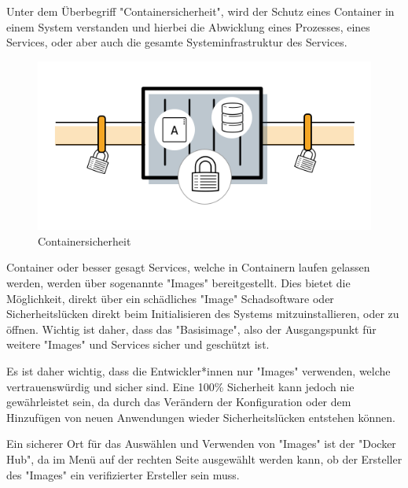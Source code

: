 
Unter dem Überbegriff "Containersicherheit", wird der Schutz eines Container in einem System verstanden und hierbei die Abwicklung eines Prozesses, eines Services, oder aber auch die gesamte Systeminfrastruktur des Services. \cite{ContainerSecurity}

\begin{figure}[H]
    \centering
    \includegraphics[width=\textwidth]{media/DockerAndContainering/Containersicherheit.png}
    \caption{Containersicherheit \cite{ContainerSecurity}}
\end{figure}


Container oder besser gesagt Services, welche in Containern laufen gelassen werden, werden über sogenannte "Images" bereitgestellt. Dies bietet die Möglichkeit, direkt über ein schädliches "Image" Schadsoftware oder Sicherheitslücken direkt beim Initialisieren des Systems mitzuinstallieren, oder zu öffnen. Wichtig ist daher, dass das "Basisimage", also der Ausgangspunkt für weitere "Images" und Services sicher und geschützt ist. \cite{ContainerSecurity}

Es ist daher wichtig, dass die Entwickler*innen nur "Images" verwenden, welche vertrauenswürdig und sicher sind. Eine 100\% Sicherheit kann jedoch nie gewährleistet sein, da durch das Verändern der Konfiguration oder dem Hinzufügen von neuen Anwendungen wieder Sicherheitslücken entstehen können. \cite{ContainerSecurity}

Ein sicherer Ort für das Auswählen und Verwenden von "Images" ist der "Docker Hub", da im Menü auf der rechten Seite ausgewählt werden kann, ob der Ersteller des "Images" ein verifizierter Ersteller sein muss. \cite{ContainerSecurity}


